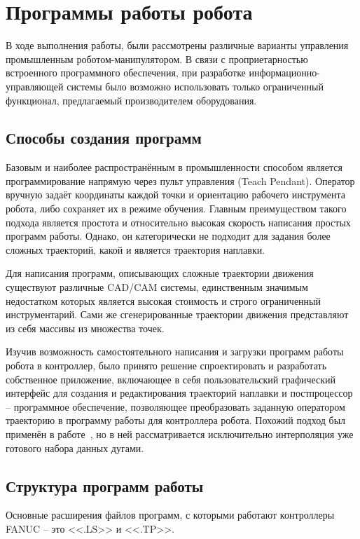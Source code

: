 \chapter{Программы работы робота}
В ходе выполнения работы, были рассмотрены различные варианты управления промышленным роботом-манипулятором.
В связи с проприетарностью встроенного программного обеспечения, при разработке информационно-управляющей системы было возможно использовать только ограниченный функционал, предлагаемый производителем оборудования.


\section{Способы создания программ}
Базовым и наиболее распространённым в промышленности способом является программирование напрямую через пульт управления (Teach Pendant).
Оператор вручную задаёт координаты каждой точки и ориентацию рабочего инструмента робота, либо сохраняет их в режиме обучения.
Главным преимуществом такого подхода является простота и относительно высокая скорость написания простых программ работы.
Однако, он категорически не подходит для задания более сложных траекторий, какой и является траектория наплавки.

Для написания программ, описывающих сложные траектории движения существуют различные CAD/CAM системы, единственным значимым недостатком которых является высокая стоимость и строго ограниченный инструментарий.
Сами же сгенерированные траектории движения представляют из себя массивы из множества точек.

Изучив возможность самостоятельного написания и загрузки программ работы робота в контроллер, было принято решение спроектировать и разработать собственное приложение, включающее в себя пользовательский графический интерфейс для создания и редактирования траекторий наплавки и постпроцессор -- программное обеспечение, позволяющее преобразовать заданную оператором траекторию в программу работы для контроллера робота.
Похожий подход был применён в работе~\cite{Nagata_2017}, но в ней рассматривается исключительно интерполяция уже готового набора данных дугами.


\section{Структура программ работы} \label{sec:ProgramStructure}
Основные расширения файлов программ, с которыми работают контроллеры FANUC -- это <<.LS>> и <<.TP>>.

